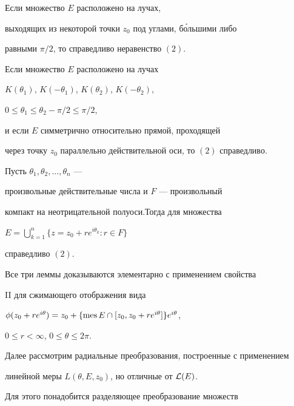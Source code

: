 \begin{lem} Если множество $E$ расположено на лучах, 


выходящих из некоторой точки $z_0$ под углами, б\'ольшими либо 


равными $\pi/2$, то справедливо неравенство $(2)$.


\end{lem}





\begin{lem} Если множество $E$ расположено на лучах


$K(\theta_1)$, $K(-\theta_1)$, $K(\theta_2)$, $K(-\theta_2)$,


$0\leq\theta_1\leq\theta_2-\pi/2\leq\pi/2$, 


и если $E$ симметрично относительно прямой, проходящей


через точку $z_0$ параллельно действительной оси, то $(2)$ справедливо.


\end{lem}





\begin{lem} Пусть $\theta _1, \theta_2,\dotsc, \theta_n$ ---


произвольные действительные числа и $F$ --- произвольный


компакт на неотрицательной полуоси.Тогда для множества 


$E=\bigcup\limits_{k=1}^{n} \{ z=z_0+re^{i\theta_k}: r\in F\}$


справедливо $(2)$.


\end{lem}





Все три леммы доказываются элементарно с применением свойства


II для сжимающего отображения вида


$\phi (z_0+re^{i\theta})=z_0+\{\operatorname{mes} E\cap[z_0,z_0+re^{i\theta}]\}e^{i\theta}$,


$0\leq r<\infty$, $0\leq\theta\leq 2\pi$.





Далее рассмотрим радиальные преобразования, построенные с применением


линейной меры $L(\theta, E, z_0)$, но отличные от ${\cal L} (E)$.


Для этого понадобится разделяющее преобразование множеств


